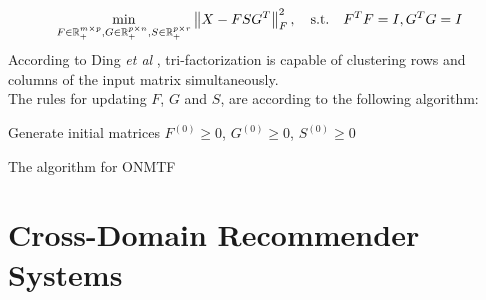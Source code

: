 \begin{equation*}
\min_{F \in \mathbb{R}^{m \times p}_+, G \in \mathbb{R}^{p \times n}_+, S \in \mathbb{R}^{p \times r}_+} \left\lVert X - F S G^T\right\rVert^2_F, \quad \text{s.t.} \quad F^TF = I, G^TG = I
\end{equation*}
According to Ding \textit{et al} \cite{10.1145/1150402.1150420}, tri-factorization is capable of clustering rows and columns of the input matrix simultaneously.\\
The rules for updating $F$, $G$ and $S$, are according to the following algorithm:
\vskip 0.7cm
\begin{algorithm}[H]
Generate initial matrices $F^{(0)} \geq 0$, $G^{(0)} \geq 0$, $S^{(0)} \geq 0$\;
\caption{The algorithm for ONMTF}
\end{algorithm}



\section{Cross-Domain Recommender Systems}

